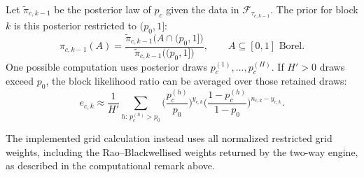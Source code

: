 \documentclass[11pt,a4paper]{article}
\theoremstyle{definition}
\theoremstyle{remark}
\newcommand{\F}{\mathcal{F}}
\begin{document}
Let $\tilde\pi_{c,k-1}$ be the posterior law of $p_c$ given the data in $\F_{\tau_{c,k-1}}$.
The prior for block $k$ is this posterior restricted to $(p_0, 1]$:
\begin{equation}\label{eq:restricted}
  \pi_{c,k-1}(A) = \frac{\tilde\pi_{c,k-1}\big(A \cap (p_0, 1]\big)}{\tilde\pi_{c,k-1}\big((p_0, 1]\big)}, \qquad A \subseteq [0,1] \text{ Borel}.
\end{equation}
One possible computation uses posterior draws
$p_c^{(1)}, \dots, p_c^{(H)}$. If $H'>0$ draws exceed $p_0$, the block
likelihood ratio can be averaged over those retained draws:
\begin{equation}\label{eq:mc}
  e_{c,k} \approx \frac{1}{H'} \sum_{h:\, p_c^{(h)} > p_0} \Big(\frac{p_c^{(h)}}{p_0}\Big)^{y_{c,k}} \Big(\frac{1-p_c^{(h)}}{1-p_0}\Big)^{n_{c,k} - y_{c,k}} .
\end{equation}

The implemented grid calculation instead uses all normalized restricted
grid weights, including the Rao--Blackwellised weights returned by the
two-way engine, as described in the computational remark above.



% 
% 
\end{document}
